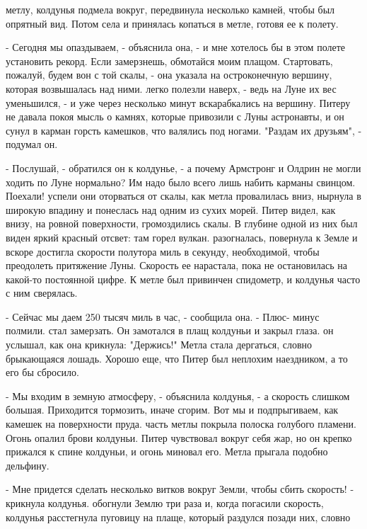  метлу, колдунья подмела вокруг, передвинула несколько камней, 
чтобы был опрятный вид. Потом села и принялась копаться в метле, 
готовя ее к полету.
\par- Сегодня мы опаздываем, - объяснила она, - и мне хотелось бы в 
этом полете установить рекорд. Если замерзнешь, обмотайся моим плащом. 
Стартовать, пожалуй, будем вон с той скалы, - она указала на 
остроконечную вершину, которая возвышалась над ними.
 легко полезли наверх, - ведь на Луне их вес уменьшился, - и 
уже через несколько минут вскарабкались на вершину. Питеру не давала 
покоя мысль о камнях, которые привозили с Луны астронавты, и он сунул 
в карман горсть камешков, что валялись под ногами. "Раздам их 
друзьям", - подумал он.
\par- Послушай, - обратился он к колдунье, - а почему Армстронг и 
Олдрин не могли ходить по Луне нормально? Им надо было всего лишь 
набить карманы свинцом. Поехали!
 успели они оторваться от скалы, как метла провалилась вниз, 
нырнула в широкую впадину и понеслась над одним из сухих морей. Питер 
видел, как внизу, на ровной поверхности, громоздились скалы. В глубине 
одной из них был виден яркий красный отсвет: там горел вулкан.
 разогналась, повернула к Земле и вскоре достигла скорости 
полутора миль в секунду, необходимой, чтобы преодолеть притяжение 
Луны. Скорость ее нарастала, пока не остановилась на какой-то 
постоянной цифре. К метле был привинчен спидометр, и колдунья часто с 
ним сверялась.
\par- Сейчас мы даем 250 тысяч миль в час, - сообщила она. - Плюс-
минус полмили.
 стал замерзать. Он замотался в плащ колдуньи и закрыл глаза.
 он услышал, как она крикнула: "Держись!" Метла стала 
дергаться, словно брыкающаяся лошадь. Хорошо еще, что Питер был 
неплохим наездником, а то его бы сбросило.
\par- Мы входим в земную атмосферу, - объяснила колдунья, - а скорость 
слишком большая. Приходится тормозить, иначе сгорим. Вот мы и 
подпрыгиваем, как камешек на поверхности пруда.
 часть метлы покрыла полоска голубого пламени. Огонь 
опалил брови колдуньи. Питер чувствовал вокруг себя жар, но он крепко 
прижался к спине колдуньи, и огонь миновал его. Метла прыгала подобно 
дельфину.
\par- Мне придется сделать несколько витков вокруг Земли, чтобы сбить 
скорость! - крикнула колдунья.
 обогнули Землю три раза и, когда погасили скорость, колдунья 
расстегнула пуговицу на плаще, который раздулся позади них, словно 
